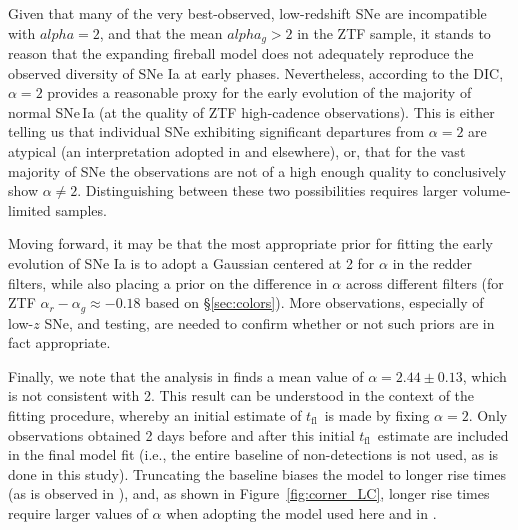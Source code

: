 \documentclass[twocolumn]{./aastex63}
\newcommand{\tfl}{$t_\mathrm{fl}$}
\begin{document}
Given that many of the very best-observed, low-redshift SNe are incompatible
with $alpha = 2$, and that the mean $alpha_g > 2$ in the ZTF sample, it stands
to reason that the expanding fireball model does not adequately reproduce the
observed diversity of SNe Ia at early phases. Nevertheless, according to the
DIC, $\alpha=2$ provides a reasonable proxy for the early evolution of the
majority of normal SNe\,Ia (at the quality of ZTF high-cadence observations).
This is either telling us that individual SNe exhibiting significant
departures from $\alpha = 2$ are atypical (an interpretation adopted in
\citealt{Hosseinzadeh17,Miller18,Dimitriadis19} and elsewhere), or, that for
the vast majority of SNe the observations are not of a high enough quality to
conclusively show $\alpha \neq 2$. Distinguishing between these two
possibilities requires larger volume-limited samples.

Moving forward, it may be that the most appropriate prior for fitting the
early evolution of SNe Ia is to adopt a Gaussian centered at 2 for $\alpha$ in
the redder filters, while also placing a prior on the difference in $\alpha$
across different filters (for ZTF $\alpha_r - \alpha_g \approx -0.18$ based on
\S\ref{sec:colors}). More observations, especially of low-$z$ SNe, and
testing, are needed to confirm whether or not such priors are in fact
appropriate.

Finally, we note that the analysis in \citet{Firth15} finds a mean value of
$\alpha = 2.44 \pm 0.13$, which is not consistent with 2. This result can be
understood in the context of the \citet{Firth15} fitting procedure, whereby an
initial estimate of \tfl\ is made by fixing $\alpha = 2$. Only observations
obtained 2 days before and after this initial \tfl\ estimate are included in
the final model fit (i.e., the entire baseline of non-detections is not used,
as is done in this study). Truncating the baseline biases the model to longer
rise times (as is observed in \citealt{Firth15}), and, as shown in
Figure~\ref{fig:corner_LC}, longer rise times require larger values of
$\alpha$ when adopting the model used here and in \citet{Firth15}.
\end{document}
